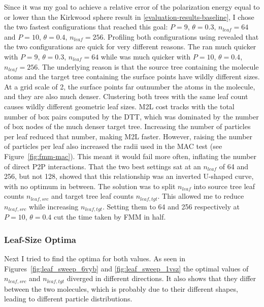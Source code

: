 Since it was my goal to achieve a relative error of the polarization energy equal to or lower than the Kirkwood sphere result in \ref{evaluation-results-baseline}, I chose the two fastest configurations that reached this goal: $P = 9$, $\theta = 0.3$, $n_{leaf} = 64$ and $P = 10$, $\theta = 0.4$, $n_{leaf} = 256$.
Profiling both configurations using  revealed that the two configurations are quick for very different reasons.
The  ran much quicker with $P = 9$, $\theta = 0.3$, $n_{leaf} = 64$ while  was much quicker with $P = 10$, $\theta = 0.4$, $n_{leaf} = 256$.
The underlying reason is that the source tree containing the molecule atoms and the target tree containing the surface points have wildly different sizes.
At a grid scale of 2, the surface points far outnumber the atoms in the molecule, and they are also much denser.
Clustering both trees with the same leaf count causes wildly different geometric leaf sizes.
M2L cost tracks with the total number of box pairs computed by the DTT, which was dominated by the number of box nodes of the much denser target tree.
Increasing the number of particles per leaf reduced that number, making M2L faster.
However, raising the number of particles per leaf also increased the radii used in the MAC test (see Figure~\ref{fig:fmm-mac}).
This meant it would fail more often, inflating the number of direct P2P interactions.
That the two best settings sat at an $n_{leaf}$ of 64 and 256, but not 128, showed that this relationship was an inverted U-shaped curve, with no optimum in between.
The solution was to split $n_{leaf}$ into source tree leaf counts $n_{leaf,src}$ and target tree leaf counts $n_{leaf,tgt}$.
This allowed me to reduce $n_{leaf,src}$ while increasing $n_{leaf,tgt}$.
Setting them to 64 and 256 respectively at $P = 10$, $\theta = 0.4$ cut the time taken by FMM in half.

\subsubsection{Leaf-Size Optima}

Next I tried to find the optima for both values.
As seen in Figures~\ref{fig:leaf_sweep_6vyb} and \ref{fig:leaf_sweep_1vsz} the optimal values of $n_{leaf,src}$ and $n_{leaf,tgt}$ diverged in different directions.
It also shows that they differ between the two molecules, which is probably due to their different shapes, leading to different particle distributions.

